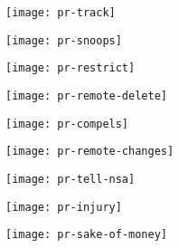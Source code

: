 \documentclass[notes]{beamer}       %
\begin{document}
\begin{frame}
  \begin{figure}
    \centering
    \texttt{[image: pr-track]}
  \end{figure}
\end{frame}

\begin{frame}
  \begin{figure}
    \centering
    \texttt{[image: pr-snoops]}
  \end{figure}
\end{frame}

\begin{frame}
  \begin{figure}
    \centering
    \texttt{[image: pr-restrict]}
  \end{figure}
\end{frame}

\begin{frame}
  \begin{figure}
    \centering
    \texttt{[image: pr-remote-delete]}
  \end{figure}
\end{frame}

\begin{frame}
  \begin{figure}
    \centering
    \texttt{[image: pr-compels]}
  \end{figure}
\end{frame}

\begin{frame}
  \begin{figure}
    \centering
    \texttt{[image: pr-remote-changes]}
  \end{figure}
\end{frame}


\begin{frame}
  \begin{figure}
    \centering
    \texttt{[image: pr-tell-nsa]}
  \end{figure}
\end{frame}

\begin{frame}
  \begin{figure}
    \centering
    \texttt{[image: pr-injury]}
  \end{figure}
\end{frame}

\begin{frame}
  \begin{figure}
    \centering
    \texttt{[image: pr-sake-of-money]}
  \end{figure}
\end{frame}
\end{document}
